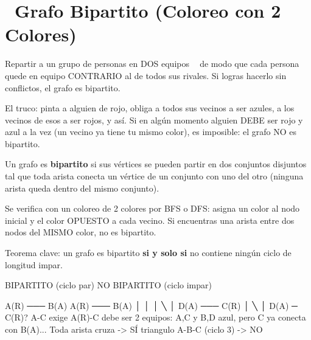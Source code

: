 \chapter[\emj{🎨}~Grafo Bipartito (2-Coloring)]{~Grafo Bipartito (Coloreo con 2 Colores)}

\begin{dsaquees}

Repartir a un grupo de personas en DOS equipos 🔴🔵 de modo que cada
persona quede en equipo CONTRARIO al de todos sus rivales. Si logras
hacerlo sin conflictos, el grafo es bipartito.

El truco: pinta a alguien de rojo, obliga a todos sus vecinos a ser
azules, a los vecinos de esos a ser rojos, y así. Si en algún momento
alguien DEBE ser rojo y azul a la vez (un vecino ya tiene tu mismo
color), es imposible: el grafo NO es bipartito.

\end{dsaquees}

\begin{dsaotraforma}

Un grafo es \textbf{bipartito} si sus vértices se pueden partir en dos
conjuntos disjuntos tal que toda arista conecta un vértice de un
conjunto con uno del otro (ninguna arista queda dentro del mismo
conjunto).

Se verifica con un coloreo de 2 colores por BFS o DFS: asigna un color
al nodo inicial y el color OPUESTO a cada vecino. Si encuentras una
arista entre dos nodos del MISMO color, no es bipartito.

Teorema clave: un grafo es bipartito \textbf{si y solo si} no contiene
ningún ciclo de longitud impar.

\end{dsaotraforma}

\begin{dsadiagrama}
BIPARTITO (ciclo par)          NO BIPARTITO (ciclo impar)

  A(R) ─── B(A)                  A(R) ─── B(A)
   │        │                     │  ╲      │
  D(A) ─── C(R)                   │   ╲     │
                                 D(A) ─ C(R)? A-C exige A(R)-C debe ser
  2 equipos: {A,C} y {B,D}       azul, pero C ya conecta con B(A)...
  Toda arista cruza -> SÍ        triangulo A-B-C (ciclo 3) -> NO
\end{dsadiagrama}

